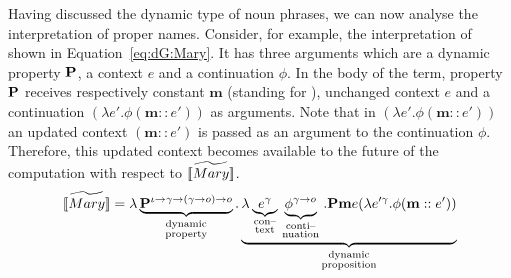 Having discussed the dynamic type of noun phrases, we can now analyse the interpretation of proper names. 
Consider, for example, the interpretation of  shown in Equation~\eqref{eq:dG:Mary}. It has three arguments which are a dynamic property $\P2$, a context $e$ and a continuation $\phi$. In the body of the term, property $\P2$ receives respectively constant $\textbf{m}$ (standing for ), unchanged context $e$ and a continuation $(\lambda e'.\phi (\textbf{m}::{e'}))$ as arguments. Note that in $(\lambda e'.\phi (\textbf{m}::{e'}))$ an updated context $(\textbf{m}::{e'})$ is passed as an argument to the continuation $\phi$. Therefore, this updated context becomes available to the future of the computation with respect to $\widetilde{[\![Mary]\!]}$. 
\begin{align}
\etr{\I{Mary}} =  \lambda \underbrace{{\P2}^{\iota \rightarrow \gamma \rightarrow (\gamma \rightarrow o) \rightarrow o}}_{\begin{smallmatrix}
\text{dynamic}\\
\text{property}
\end{smallmatrix}}. \underbrace{\lambda \underbrace{{e}^{\gamma}}_{\begin{smallmatrix}
\text{con--}\\
\text{text}
\end{smallmatrix}} \underbrace{{\phi}^{\gamma \rightarrow o}}_{\begin{smallmatrix}
\text{conti--}\\
\text{nuation}
\end{smallmatrix}}.\P2 \textbf{m} e (\lambda e'^{\gamma}. \phi ( \upii{\textbf{m}}{e'}))}_{
\begin{smallmatrix}
\text{dynamic}\\
\text{proposition}
\end{smallmatrix}}\label{eq:dG:Mary}
\end{align}

